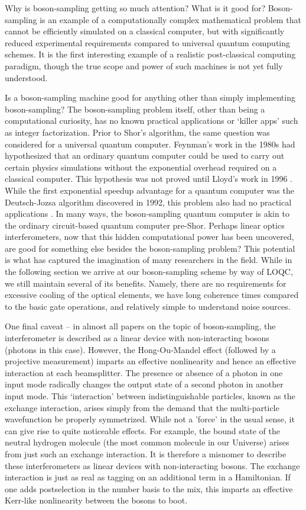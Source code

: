 \documentclass[aps,pra,twocolumn,amsmath,amssymb,nofootinbib,superscriptaddress]{revtex4}
\begin{document}
Why is boson-sampling getting so much attention?  What is it good for? Boson-sampling is an example of a computationally complex mathematical problem that cannot be efficiently simulated on a classical computer, but with significantly reduced experimental requirements compared to universal quantum computing schemes. It is the first interesting example of a realistic post-classical computing paradigm, though the true scope and power of such machines is not yet fully understood. 

Is a boson-sampling machine good for anything other than simply implementing boson-sampling? The boson-sampling problem itself, other than being a computational curiosity, has no known practical applications or `killer apps' such as integer factorization. Prior to Shor's algorithm, the same question was considered for a universal quantum computer.  Feynman's work in the 1980s had hypothesized that an ordinary quantum computer could be used to carry out certain physics simulations without the exponential overhead required on a classical computer.  This hypothesis was not proved until Lloyd's work in 1996 \cite{feyn,lloyd}. While the first exponential speedup advantage for a quantum computer was the Deutsch-Jozsa algorithm discovered in 1992, this problem also had no practical applications \cite{deutsch}. In many ways, the boson-sampling quantum computer is akin to the ordinary circuit-based quantum computer pre-Shor.  Perhaps linear optics interferometers, now that this hidden computational power has been uncovered, are good for something else besides the boson-sampling problem? This potential is what has captured the imagination of many researchers in the field. While in the following section we arrive at our boson-sampling scheme by way of LOQC, we still maintain several of its benefits.  Namely, there are no requirements for excessive cooling of the optical elements, we have long coherence times compared to the basic gate operations, and relatively simple to understand noise sources.

One final caveat -- in almost all papers on the topic of boson-sampling, the interferometer is described as a linear device with non-interacting bosons (photons in this case). However, the Hong-Ou-Mandel effect (followed by a projective measurement) imparts an effective nonlinearity and hence an effective interaction at each beamsplitter. The presence or absence of a photon in one input mode radically changes the output state of a second photon in another input mode. This `interaction' between indistinguishable particles, known as the exchange interaction, arises simply from the demand that the multi-particle wavefunction be properly symmetrized. While not a 'force' in the usual sense, it can give rise to quite noticeable effects. For example, the bound state of the neutral hydrogen molecule (the most common molecule in our Universe) arises from just such an exchange interaction. It is therefore a misnomer to describe these interferometers as linear devices with non-interacting bosons. The exchange interaction is just as real as tagging on an additional term in a Hamiltonian.  If one adds postselection in the number basis to the mix, this imparts an effective Kerr-like nonlinearity between the bosons to boot.   
\end{document}

